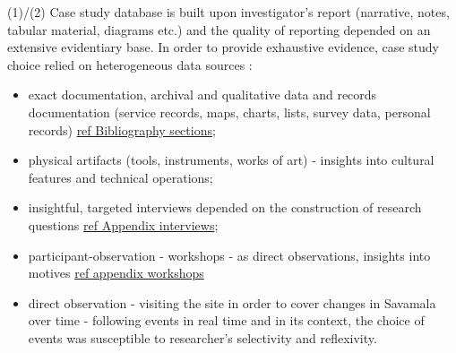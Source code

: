 \documentclass[11pt]{report}
\begin{document}
(1)/(2) Case study database is built upon investigator's report (narrative, notes, tabular material, diagrams etc.) and the quality of reporting depended on an extensive evidentiary base. In order to provide exhaustive evidence, case study choice relied on heterogeneous data sources \cite{(Yin XXX)}:
\begin{itemize}
\item exact documentation, archival and qualitative data and records documentation (service records, maps, charts, lists, survey data, personal records) \href{ref}{ref Bibliography sections};
\item physical artifacts (tools, instruments, works of art) - insights into cultural features and technical operations;
\item insightful, targeted interviews depended on the construction of research questions \href{ref}{ref Appendix interviews};
\item participant-observation - workshops -  as direct observations, insights into motives \href{ref}{ref appendix workshops}
\item direct observation - visiting the site in order to cover changes in Savamala over time -  following events in real time and in its context, the choice of events was susceptible to researcher's  selectivity and reflexivity.
\end{itemize}
\end{document}
